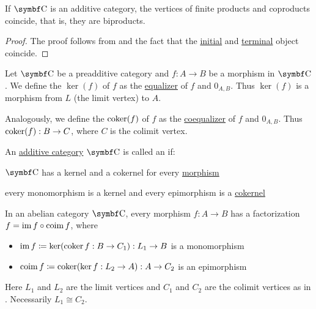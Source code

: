 \begin{theorem}\label{thm:additive_category_biproducts}
  If \( \Cat{C} \) is an additive category, the vertices of finite products and coproducts coincide, that is, they are biproducts.
\end{theorem}
\begin{proof}
  The proof follows from  and the fact that the \hyperref[remark:empty_categorical_coproduct]{initial} and \hyperref[remark:empty_categorical_product]{terminal} object coincide.
\end{proof}

\begin{definition}\label{def:categorical_kernel}
  Let \( \Cat{C} \) be a preadditive category and \( f: A \to B \) be a morphism in \( \Cat{C} \). We define the  \( \ker(f) \) of \( f \) as the \hyperref[def:categorical_equalizer]{equalizer} of \( f \) and \( 0_{A,B} \). Thus \( \ker(f) \) is a morphism from \( L \) (the limit vertex) to \( A \).

  Analogously, we define the  \( \operatorname{co}\!\ker(f) \) of \( f \) as the \hyperref[def:categorical_coequalizer]{coequalizer} of \( f \) and \( 0_{A,B} \). Thus \( \operatorname{co}\!\ker(f): B \to C \), where \( C \) is the colimit vertex.
\end{definition}

\begin{definition}\label{def:abelian_category}
  An \hyperref[def:additive_category]{additive category} \( \Cat{C} \) is called an  if:
  \begin{DefEnum}
    \item \( \Cat{C} \) has a kernel and a cokernel for every \hyperref[def:categorical_kernel]{morphism}
    \item every monomorphism is a kernel and every epimorphism is a \hyperref[def:morphism_invertibility]{cokernel}
  \end{DefEnum}
\end{definition}

\begin{proposition}\label{thm:abelian_category_morphism_factorization}
  In an abelian category \( \Cat{C} \), every morphism \( f: A \to B \) has a factorization \( f = \operatorname{im} f \circ \operatorname{co}\!\operatorname{im} f \), where
  \begin{itemize}
    \item \( \operatorname{im} f \coloneqq \ker(\operatorname{co}\!\ker f: B \to C_1): L_1 \to B \) is a monomorphism
    \item \( \operatorname{co}\!\operatorname{im} f \coloneqq \operatorname{co}\!\ker(\ker f: L_2 \to A): A \to C_2 \) is an epimorphism
  \end{itemize}
  Here \( L_1 \) and \( L_2 \) are the limit vertices and \( C_1 \) and \( C_2 \) are the colimit vertices as in . Necessarily \( L_1 \cong C_2 \).
\end{proposition}

